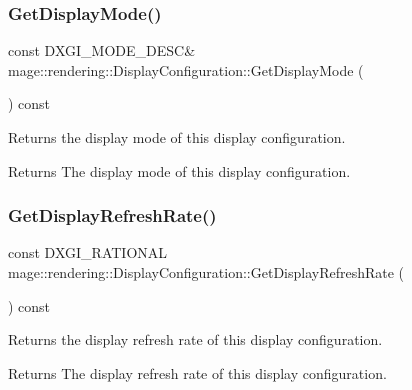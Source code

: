 \subsubsection{\texorpdfstring{Get\+Display\+Mode()}{GetDisplayMode()}}
{\footnotesize\ttfamily const D\+X\+G\+I\+\_\+\+M\+O\+D\+E\+\_\+\+D\+E\+SC\& mage\+::rendering\+::\+Display\+Configuration\+::\+Get\+Display\+Mode (\begin{DoxyParamCaption}{ }\end{DoxyParamCaption}) const\hspace{0.3cm}{\ttfamily [noexcept]}}

Returns the display mode of this display configuration.

\begin{DoxyReturn}{Returns}
The display mode of this display configuration. 
\end{DoxyReturn}
\mbox{\label{classmage_1_1rendering_1_1_display_configuration_ae100fc84cd1900e302fb784f429a06b7}} 
\subsubsection{\texorpdfstring{Get\+Display\+Refresh\+Rate()}{GetDisplayRefreshRate()}}
{\footnotesize\ttfamily const D\+X\+G\+I\+\_\+\+R\+A\+T\+I\+O\+N\+AL mage\+::rendering\+::\+Display\+Configuration\+::\+Get\+Display\+Refresh\+Rate (\begin{DoxyParamCaption}{ }\end{DoxyParamCaption}) const\hspace{0.3cm}{\ttfamily [noexcept]}}

Returns the display refresh rate of this display configuration.

\begin{DoxyReturn}{Returns}
The display refresh rate of this display configuration. 
\end{DoxyReturn}
\mbox{\label{classmage_1_1rendering_1_1_display_configuration_a1394352b2a3f80fb1cc24d96f744ae3c}} 
